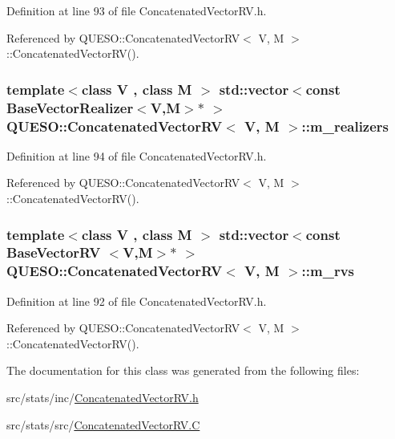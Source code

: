 Definition at line 93 of file Concatenated\-Vector\-R\-V.\-h.



Referenced by Q\-U\-E\-S\-O\-::\-Concatenated\-Vector\-R\-V$<$ V, M $>$\-::\-Concatenated\-Vector\-R\-V().

\hypertarget{class_q_u_e_s_o_1_1_concatenated_vector_r_v_af5481dcec21a16d9b3d00a35d161d34f}{
\subsubsection[{m\-\_\-realizers}]{\setlength{\rightskip}{0pt plus 5cm}template$<$class V , class M $>$ std\-::vector$<$const {\bf Base\-Vector\-Realizer}$<$V,M$>$$\ast$ $>$ {\bf Q\-U\-E\-S\-O\-::\-Concatenated\-Vector\-R\-V}$<$ V, M $>$\-::m\-\_\-realizers\hspace{0.3cm}{\ttfamily [private]}}}\label{class_q_u_e_s_o_1_1_concatenated_vector_r_v_af5481dcec21a16d9b3d00a35d161d34f}


Definition at line 94 of file Concatenated\-Vector\-R\-V.\-h.



Referenced by Q\-U\-E\-S\-O\-::\-Concatenated\-Vector\-R\-V$<$ V, M $>$\-::\-Concatenated\-Vector\-R\-V().

\hypertarget{class_q_u_e_s_o_1_1_concatenated_vector_r_v_a5b69ebda44adae11e7d45987dac4b0a6}{
\subsubsection[{m\-\_\-rvs}]{\setlength{\rightskip}{0pt plus 5cm}template$<$class V , class M $>$ std\-::vector$<$const {\bf Base\-Vector\-R\-V} $<$V,M$>$$\ast$ $>$ {\bf Q\-U\-E\-S\-O\-::\-Concatenated\-Vector\-R\-V}$<$ V, M $>$\-::m\-\_\-rvs\hspace{0.3cm}{\ttfamily [private]}}}\label{class_q_u_e_s_o_1_1_concatenated_vector_r_v_a5b69ebda44adae11e7d45987dac4b0a6}


Definition at line 92 of file Concatenated\-Vector\-R\-V.\-h.



Referenced by Q\-U\-E\-S\-O\-::\-Concatenated\-Vector\-R\-V$<$ V, M $>$\-::\-Concatenated\-Vector\-R\-V().



The documentation for this class was generated from the following files\-:\begin{DoxyCompactItemize}
\item 
src/stats/inc/\hyperlink{_concatenated_vector_r_v_8h}{Concatenated\-Vector\-R\-V.\-h}\item 
src/stats/src/\hyperlink{_concatenated_vector_r_v_8_c}{Concatenated\-Vector\-R\-V.\-C}\end{DoxyCompactItemize}
